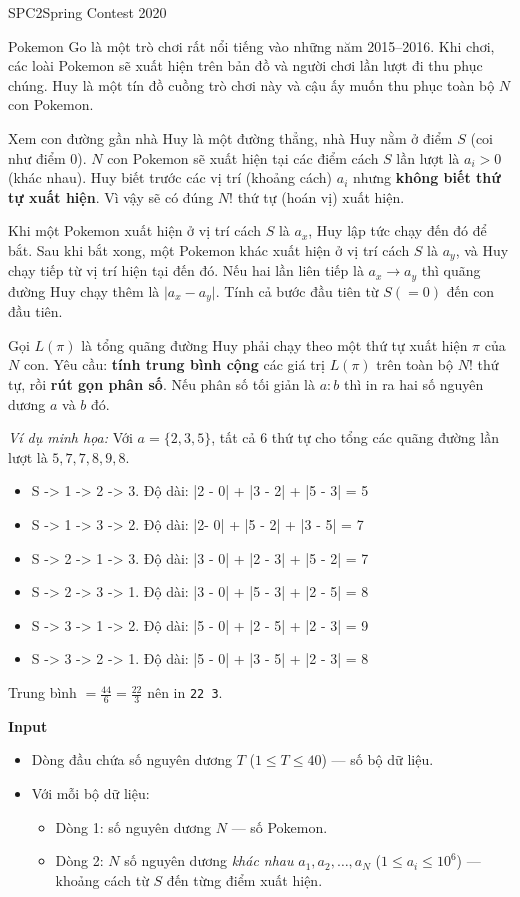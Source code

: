 \begin{baitap}{SPC2}{Spring Contest 2020}

Pokemon Go là một trò chơi rất nổi tiếng vào những năm 2015–2016. Khi chơi, các loài Pokemon sẽ xuất hiện trên bản đồ và người chơi lần lượt đi thu phục chúng. Huy là một tín đồ cuồng trò chơi này và cậu ấy muốn thu phục toàn bộ $N$ con Pokemon.

Xem con đường gần nhà Huy là một đường thẳng, nhà Huy nằm ở điểm $S$ (coi như điểm $0$). $N$ con Pokemon sẽ xuất hiện tại các điểm cách $S$ lần lượt là $a_i>0$ (khác nhau). Huy biết trước các vị trí (khoảng cách) $a_i$ nhưng \textbf{không biết thứ tự xuất hiện}. Vì vậy sẽ có đúng $N!$ thứ tự (hoán vị) xuất hiện.

Khi một Pokemon xuất hiện ở vị trí cách $S$ là $a_x$, Huy lập tức chạy đến đó để bắt. Sau khi bắt xong, một Pokemon khác xuất hiện ở vị trí cách $S$ là $a_y$, và Huy chạy tiếp từ vị trí hiện tại đến đó. Nếu hai lần liên tiếp là $a_x \to a_y$ thì quãng đường Huy chạy thêm là $\lvert a_x - a_y \rvert$. Tính cả bước đầu tiên từ $S(=0)$ đến con đầu tiên.

Gọi $L(\pi)$ là tổng quãng đường Huy phải chạy theo một thứ tự xuất hiện $\pi$ của $N$ con. Yêu cầu: \textbf{tính trung bình cộng} các giá trị $L(\pi)$ trên toàn bộ $N!$ thứ tự, rồi \textbf{rút gọn phân số}. Nếu phân số tối giản là $a:b$ thì in ra hai số nguyên dương $a$ và $b$ đó.

\textit{Ví dụ minh họa:} Với $a=\{2,3,5\}$, tất cả $6$ thứ tự cho tổng các quãng đường lần lượt là $5,7,7,8,9,8$. 

\begin{itemize}
    \item S -> 1 -> 2 -> 3. Độ dài: |2 - 0| + |3 - 2| + |5 - 3| = 5
    \item S -> 1 -> 3 -> 2. Độ dài: |2- 0| + |5 - 2| + |3 - 5| = 7
    \item S -> 2 -> 1 -> 3. Độ dài: |3 - 0| + |2 - 3| + |5 - 2| = 7
    \item S -> 2 -> 3 -> 1. Độ dài: |3 - 0| + |5 - 3| + |2 - 5| = 8
    \item S -> 3 -> 1 -> 2. Độ dài: |5 - 0| + |2 - 5| + |2 - 3| = 9
    \item S -> 3 -> 2 -> 1. Độ dài: |5 - 0| + |3 - 5| + |2 - 3| = 8
\end{itemize}

Trung bình $=\frac{44}{6}=\frac{22}{3}$ nên in \texttt{22 3}.

\textbf{Input}
\begin{itemize}[noitemsep]
    \item Dòng đầu chứa số nguyên dương $T$ ($1 \le T \le 40$) — số bộ dữ liệu.
    \item Với mỗi bộ dữ liệu:
    \begin{itemize}[noitemsep]
        \item Dòng 1: số nguyên dương $N$ — số Pokemon.
        \item Dòng 2: $N$ số nguyên dương \emph{khác nhau} $a_1, a_2, \dots, a_N$ ($1 \le a_i \le 10^6$) — khoảng cách từ $S$ đến từng điểm xuất hiện.
    \end{itemize}
\end{itemize}


\end{baitap}
